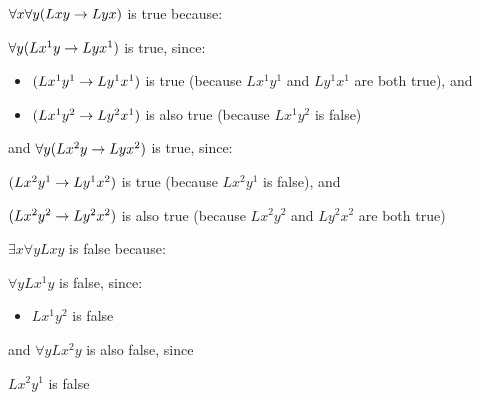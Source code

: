 \begin{ebullet}
\item $\forall x\forall y(Lxy \rightarrow Lyx)$ is true because:
\begin{etriangle}
\item $\forall y(Lx^1y \rightarrow Lyx^1)$ is true, since:
\begin{itemize}
\item $(Lx^1y^1 \rightarrow Ly^1x^1)$ is true (because $Lx^1y^1$ and $Ly^1x^1$ are both true), and
\item $(Lx^1y^2 \rightarrow Ly^2x^1)$ is also true (because $Lx^1y^2$ is false)
\end{itemize}

\item and $\forall y(Lx^2y \rightarrow Lyx^2)$ is true, since:
\begin{etriangle}
\item $(Lx^2y^1 \rightarrow Ly^1x^2)$ is true (because $Lx^2y^1$ is false), and
\item $(Lx^2y^2 \rightarrow Ly^2x^2)$ is also true (because $Lx^2y^2$ and $Ly^2x^2$ are both true)
\end{etriangle}
\end{etriangle}
\end{ebullet}

\begin{ebullet}
\item $\exists x\forall yLxy$ is false because:
\begin{etriangle}
\item $\forall y Lx^1y$ is false, since:
\begin{itemize}
\item $Lx^1y^2$ is false
\end{itemize}
\item and $\forall y Lx^2y$ is also false, since
\begin{etriangle}
\item $Lx^2y^1$ is false
\end{etriangle}
\end{etriangle}
\end{ebullet}

